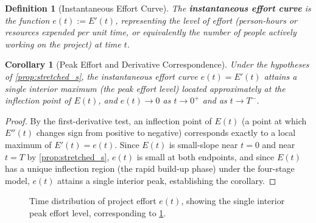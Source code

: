 \documentclass[12pt, a4paper]{report}
\theoremstyle{engnotes}
\newtheorem{corollary}{Corollary}[section]
\newtheorem{defn}{Definition}[section]
\begin{document}
\begin{defn}[Instantaneous Effort Curve]\label{def:instantaneous_effort}
    The \textbf{instantaneous effort curve} is the function $e(t) := E'(t)$, representing the level of effort (person-hours or resources expended per unit time, or equivalently the number of people actively working on the project) at time $t$.
\end{defn}

\begin{corollary}[Peak Effort and Derivative Correspondence]\label{cor:peak_effort}
    Under the hypotheses of \cref{prop:stretched_s}, the instantaneous effort curve $e(t) = E'(t)$ attains a single interior maximum (the \emph{peak effort level}) located approximately at the inflection point of $E(t)$, and $e(t) \to 0$ as $t \to 0^+$ and as $t \to T^-$.
\end{corollary}

\begin{proof}
    By the first-derivative test, an inflection point of $E(t)$ (a point at which $E''(t)$ changes sign from positive to negative) corresponds exactly to a local maximum of $E'(t) = e(t)$. Since $E(t)$ is small-slope near $t=0$ and near $t=T$ by \cref{prop:stretched_s}, $e(t)$ is small at both endpoints, and since $E(t)$ has a unique inflection region (the rapid build-up phase) under the four-stage model, $e(t)$ attains a single interior peak, establishing the corollary.
\end{proof}

\begin{figure}[H]
	\centering
	\caption{Time distribution of project effort $e(t)$, showing the single interior peak effort level, corresponding to \cref{cor:peak_effort}.}
	\label{fig:effort_distribution}
\end{figure}
\end{document}

